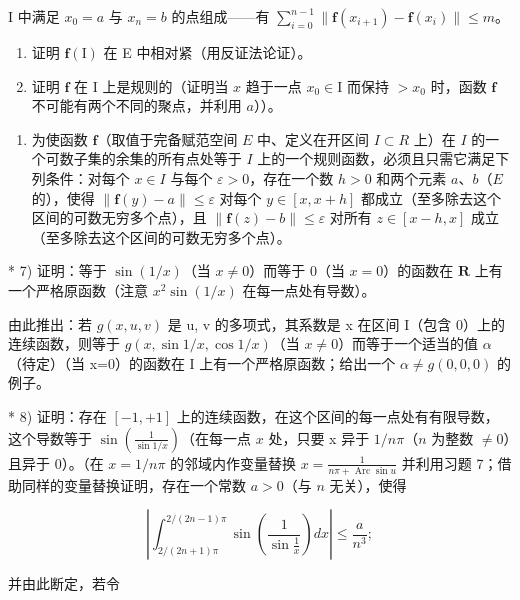 I 中满足 \(x_0 = a\) 与 \(x_n = b\) 的点组成——有 \(\sum_{i=0}^{n-1} \| \mathbf{f}(x_{i+1}) - \mathbf{f}(x_i) \| \leqslant m\)。

\begin{enumerate}
\def\labelenumi{\alph{enumi})}
\item
  证明 \(\mathbf{f}(\mathrm{I})\) 在 E 中相对紧（用反证法论证）。
\item
  证明 \(\mathbf{f}\) 在 I 上是规则的（证明当 \(x\) 趋于一点 \(x_0 \in \mathrm{I}\) 而保持 \(>x_0\) 时，函数 \(\mathbf{f}\) 不可能有两个不同的聚点，并利用 \(a\)））。
\end{enumerate}

\begin{enumerate}
\def\labelenumi{\arabic{enumi})}
\setcounter{enumi}{5}
\tightlist
\item
  为使函数 \(\mathbf{f}\)（取值于完备赋范空间 \(E\) 中、定义在开区间 \(I \subset R\) 上）在 \(I\) 的一个可数子集的余集的所有点处等于 \(I\) 上的一个规则函数，必须且只需它满足下列条件：对每个 \(x \in I\) 与每个 \(\varepsilon > 0\)，存在一个数 \(h > 0\) 和两个元素 \(a\)、\(b\)（\(E\) 的），使得 \(\| \mathbf{f}(y) - a \| \leqslant \varepsilon\) 对每个 \(y \in [x, x + h]\) 都成立（至多除去这个区间的可数无穷多个点），且 \(\| \mathbf{f}(z) - b \| \leqslant \varepsilon\) 对所有 \(z \in [x - h, x]\) 成立（至多除去这个区间的可数无穷多个点）。
\end{enumerate}

* 7) 证明：等于 \(\sin(1/x)\)（当 \(x \neq 0\)）而等于 0（当 \(x = 0\)）的函数在 \(\mathbf{R}\) 上有一个严格原函数（注意 \(x^2 \sin(1/x)\) 在每一点处有导数）。

由此推出：若 \(g(x,u,v)\) 是 u, v 的多项式，其系数是 x 在区间 I（包含 0）上的连续函数，则等于 \(g(x,\sin1/x,\cos1/x)\)（当 \(x\neq0\)）而等于一个适当的值 \(\alpha\)（待定）（当 x=0）的函数在 I 上有一个严格原函数；给出一个 \(\alpha\neq g(0,0,0)\) 的例子。

* 8) 证明：存在 \([-1, +1]\) 上的连续函数，在这个区间的每一点处有有限导数，这个导数等于 \(\sin\left(\frac{1}{\sin 1/x}\right)\)（在每一点 \(x\) 处，只要 x 异于 \(1/n\pi\)（\(n\) 为整数 \(\neq 0\)）且异于 0）。（在 \(x = 1/n\pi\) 的邻域内作变量替换 \(x = \frac{1}{n\pi + \operatorname{Arc} \sin u}\) 并利用习题 7；借助同样的变量替换证明，存在一个常数 \(a > 0\)（与 \(n\) 无关），使得

\[
\left| \int_ {2 / (2 n + 1) \pi} ^ {2 / (2 n - 1) \pi} \sin \left(\frac {1}{\sin \frac {1}{x}}\right) d x \right| \leqslant \frac {a}{n ^ {3}};
\]

并由此断定，若令

